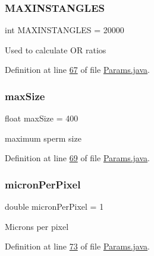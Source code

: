 \subsubsection{\texorpdfstring{M\+A\+X\+I\+N\+S\+T\+A\+N\+G\+L\+ES}{MAXINSTANGLES}}
{\footnotesize\ttfamily int M\+A\+X\+I\+N\+S\+T\+A\+N\+G\+L\+ES = 20000\hspace{0.3cm}{\ttfamily [static]}}

Used to calculate OR ratios 

Definition at line \hyperlink{_params_8java_source_l00067}{67} of file \hyperlink{_params_8java_source}{Params.\+java}.

\hypertarget{classdata_1_1_params_a7274c4f365a3b3d5e70f4c0e797684ac}{}\label{classdata_1_1_params_a7274c4f365a3b3d5e70f4c0e797684ac} 
\subsubsection{\texorpdfstring{max\+Size}{maxSize}}
{\footnotesize\ttfamily float max\+Size = 400\hspace{0.3cm}{\ttfamily [static]}}

maximum sperm size 

Definition at line \hyperlink{_params_8java_source_l00069}{69} of file \hyperlink{_params_8java_source}{Params.\+java}.

\hypertarget{classdata_1_1_params_a19331ee97ef3c422984fc7dff976549e}{}\label{classdata_1_1_params_a19331ee97ef3c422984fc7dff976549e} 
\subsubsection{\texorpdfstring{micron\+Per\+Pixel}{micronPerPixel}}
{\footnotesize\ttfamily double micron\+Per\+Pixel = 1\hspace{0.3cm}{\ttfamily [static]}}

Microns per pixel 

Definition at line \hyperlink{_params_8java_source_l00073}{73} of file \hyperlink{_params_8java_source}{Params.\+java}.

\hypertarget{classdata_1_1_params_a0aac8d82501e8bd6df290478d853662b}{}\label{classdata_1_1_params_a0aac8d82501e8bd6df290478d853662b} 
